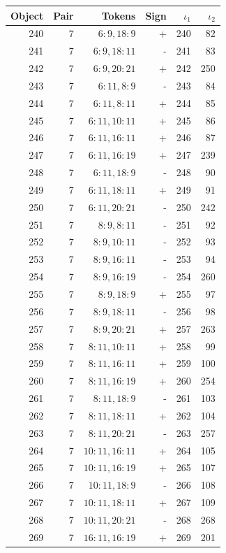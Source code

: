 \begin{center}\begin{tabular}{rrrrrr}\toprule Object & Pair & Tokens & Sign & $\iota_1$ & $\iota_2$\\\midrule
240 & 7 & $6:9,18:9$ & + & 240 & 82\\
241 & 7 & $6:9,18:11$ & - & 241 & 83\\
242 & 7 & $6:9,20:21$ & + & 242 & 250\\
243 & 7 & $6:11,8:9$ & - & 243 & 84\\
244 & 7 & $6:11,8:11$ & + & 244 & 85\\
245 & 7 & $6:11,10:11$ & + & 245 & 86\\
246 & 7 & $6:11,16:11$ & + & 246 & 87\\
247 & 7 & $6:11,16:19$ & + & 247 & 239\\
248 & 7 & $6:11,18:9$ & - & 248 & 90\\
249 & 7 & $6:11,18:11$ & + & 249 & 91\\
250 & 7 & $6:11,20:21$ & - & 250 & 242\\
251 & 7 & $8:9,8:11$ & - & 251 & 92\\
252 & 7 & $8:9,10:11$ & - & 252 & 93\\
253 & 7 & $8:9,16:11$ & - & 253 & 94\\
254 & 7 & $8:9,16:19$ & - & 254 & 260\\
255 & 7 & $8:9,18:9$ & + & 255 & 97\\
256 & 7 & $8:9,18:11$ & - & 256 & 98\\
257 & 7 & $8:9,20:21$ & + & 257 & 263\\
258 & 7 & $8:11,10:11$ & + & 258 & 99\\
259 & 7 & $8:11,16:11$ & + & 259 & 100\\
260 & 7 & $8:11,16:19$ & + & 260 & 254\\
261 & 7 & $8:11,18:9$ & - & 261 & 103\\
262 & 7 & $8:11,18:11$ & + & 262 & 104\\
263 & 7 & $8:11,20:21$ & - & 263 & 257\\
264 & 7 & $10:11,16:11$ & + & 264 & 105\\
265 & 7 & $10:11,16:19$ & + & 265 & 107\\
266 & 7 & $10:11,18:9$ & - & 266 & 108\\
267 & 7 & $10:11,18:11$ & + & 267 & 109\\
268 & 7 & $10:11,20:21$ & - & 268 & 268\\
269 & 7 & $16:11,16:19$ & + & 269 & 201\\

\end{tabular}
\end{center}
